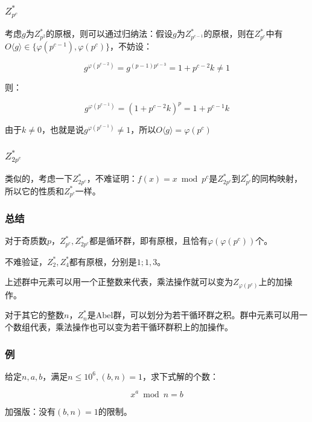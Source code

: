 \documentclass[10pt]{beamer}
\begin{document}
	\begin{frame}
		\frametitle{$Z^*_{p^c}$}
	
		考虑$g$为$Z^*_{p^2}$的原根，则可以通过归纳法：假设$g$为$Z^*_{p^{c-1}}$的原根，则在$Z^*_{p^c}$中有$O\langle g\rangle\in\{\varphi(p^{c-1}),\varphi(p^c)\}$，不妨设：

		$$
		g^{\varphi(p^{c-2})}=g^{(p-1)p^{c-3}}=1+p^{c-2}k\not=1
		$$

		则：

		$$
		g^{\varphi(p^{c-1})}=(1+p^{c-2}k)^p=1+p^{c-1}k
		$$

		由于$k\not=0$，也就是说$g^{\varphi(p^{c-1})}\not=1$，所以$O\langle g\rangle=\varphi(p^c)$
	
	\end{frame}
	\begin{frame}
		\frametitle{$Z^*_{2p^c}$}
	
		类似的，考虑一下$Z^*_{2p^c}$，不难证明：$f(x)=x\bmod p^c$是$Z^*_{2p^c}$到$Z^*_{p^c}$的同构映射，所以它的性质和$Z^*_{p^c}$一样。
	
	\end{frame}
	\begin{frame}
		\frametitle{总结}
	
		对于奇质数$p$，$Z^*_{p^c},Z^*_{2p^c}$都是循环群，即有原根，且恰有$\varphi(\varphi(p^c))$个。

		不难验证，$Z^*_2,Z^*_4$都有原根，分别是$1;1,3$。

		上述群中元素可以用一个正整数来代表，乘法操作就可以变为$Z_{\varphi(p^c)}$上的加操作。

		对于其它的整数$n$，$Z^*_n$是Abel群，可以划分为若干循环群之积。群中元素可以用一个数组代表，乘法操作也可以变为若干循环群积上的加操作。
	
	\end{frame}
	\begin{frame}
		\frametitle{例}
	
		给定$n,a,b$，满足$n\le 10^6,(b,n)=1$，求下式解的个数：

		$$
		x^a \bmod n=b
		$$

		加强版：没有$(b,n)=1$的限制。
	
	\end{frame}
\end{document}
